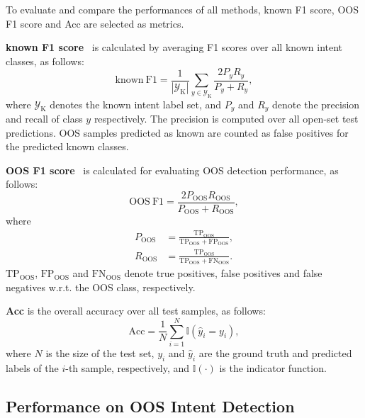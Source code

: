 \documentclass[11pt]{article}
\begin{document}
To evaluate and compare the performances of all methods, known F1 score, OOS F1 score and Acc are selected as metrics.

\textbf{known F1 score}~\citep{wang2021texsmart,zawbaa2024improved} is calculated by averaging F1 scores over all known intent classes, as follows:
\begin{equation}
\mathrm{known\ F1}=\frac{1}{|\mathcal{Y}_{\mathrm{K}}|}\sum_{y\in\mathcal{Y}_{\mathrm{K}}}\frac{2P_yR_y}{P_y+R_y},
\end{equation}
where $\mathcal{Y}_{\mathrm{K}}$ denotes the known intent label set, and $P_y$ and $R_y$ denote the precision and recall of class $y$ respectively. The precision is computed over all open-set test predictions. OOS samples predicted as known are counted as false positives for the predicted known classes.

\textbf{OOS F1 score}~\citep{wang2021texsmart,zawbaa2024improved} is calculated for evaluating OOS detection performance, as follows:
\begin{equation}
\mathrm{OOS\ F1}=\frac{2P_{\mathrm{OOS}}R_{\mathrm{OOS}}}{P_{\mathrm{OOS}}+R_{\mathrm{OOS}}},
\end{equation}
where
\begin{equation}
\begin{aligned}
P_{\mathrm{OOS}}&=\frac{\mathrm{TP}_{\mathrm{OOS}}}{\mathrm{TP}_{\mathrm{OOS}}+\mathrm{FP}_{\mathrm{OOS}}},\\
R_{\mathrm{OOS}}&=\frac{\mathrm{TP}_{\mathrm{OOS}}}{\mathrm{TP}_{\mathrm{OOS}}+\mathrm{FN}_{\mathrm{OOS}}}.
\end{aligned}
\end{equation}
$\mathrm{TP}_{\mathrm{OOS}}$, $\mathrm{FP}_{\mathrm{OOS}}$ and $\mathrm{FN}_{\mathrm{OOS}}$ denote true positives, false positives and false negatives w.r.t. the OOS class, respectively.

\textbf{Acc} is the overall accuracy over all test samples, as follows:
\begin{equation}
\mathrm{Acc}=\frac{1}{N}\sum_{i=1}^{N}\mathbb{I}(\hat{y}_i=y_i),
\end{equation}
where $N$ is the size of the test set, $y_i$ and $\hat{y}_i$ are the ground truth and predicted labels of the $i$-th sample, respectively, and $\mathbb{I}(\cdot)$ is the indicator function.

\subsection{Performance on OOS Intent Detection}
\end{document}
